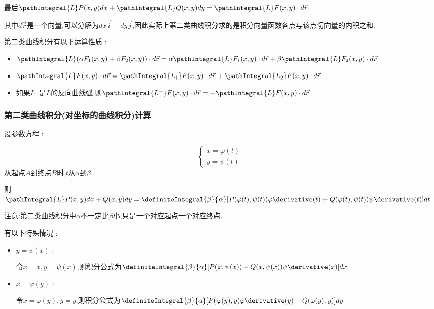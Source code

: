 {{{    最后$\pathIntegral{L}P(x,y)dx + \pathIntegral{L}Q(x,y)dy = \pathIntegral{L}F(x,y) \cdot d\vec{r}$

    其中$d\vec{r}$是一个向量,可以分解为$dx\vec{i} + dy\vec{j}$,因此实际上第二类曲线积分求的是积分向量函数各点与该点切向量的内积之和.

    第二类曲线积分有以下运算性质 :
    \begin{itemize}
      \item $\pathIntegral{L}(\alpha F_1(x,y) + \beta F_2(x,y)) \cdot d\vec{r} = \alpha\pathIntegral{L}F_1(x,y) \cdot d\vec{r} + \beta\pathIntegral{L}F_2(x,y) \cdot d\vec{r}$
      \item $\pathIntegral{L}F(x,y) \cdot d\vec{r} = \pathIntegral{L_1}F(x,y) \cdot d\vec{r} + \pathIntegral{L_2}F(x,y) \cdot d\vec{r}$
      \item 如果$L^-$是$L$的反向曲线弧,则$\pathIntegral{L^-}F(x,y) \cdot d\vec{r} = -\pathIntegral{L}F(x,y) \cdot d\vec{r}$
    \end{itemize}
    }%

    \subsubsection{第二类曲线积分(对坐标的曲线积分)计算}{
      设参数方程 :
      \begin{center}
        $$
          \begin{cases}
            x = \varphi(t) \\
            y = \psi(t)
          \end{cases}
        $$
        从起点$A$到终点$B$时,$t$从$\alpha$到$\beta$.
      \end{center}
      则$\pathIntegral{L}P(x,y)dx + Q(x,y)dy = \definiteIntegral{\beta}{\alpha}[P(\varphi(t),\psi(t))\varphi\derivative(t) + Q(\varphi(t),\psi(t))\psi\derivative(t)]dt$

      注意:第二类曲线积分中$\alpha$不一定比$\beta$小,只是一个对应起点一个对应终点.

      有以下特殊情况 :
      \begin{itemize}
        \item {
              $y = \psi(x)$ :

              令$x = x,y = \psi(x)$,则积分公式为$\definiteIntegral{\beta}{\alpha}[P(x,\psi(x)) + Q(x,\psi(x))\psi\derivative(x)]dx$
              }
        \item{
              $x = \varphi(y)$ :

              令$x = \varphi(y),y = y$,则积分公式为$\definiteIntegral{\beta}{\alpha}[P(\varphi(y),y)\varphi\derivative(y) + Q(\varphi(y),y)]dy$
              }
      \end{itemize}
    }%

}}
